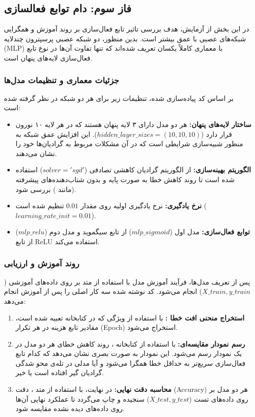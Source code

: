 \documentclass{article}
\begin{document}
\subsection{فاز سوم: دام توابع فعالسازی }
در این بخش از آزمایش، هدف بررسی تاثیر تابع فعال‌سازی بر روند آموزش و همگرایی شبکه‌های عصبی با عمق بیشتر است. بدین منظور، دو شبکه عصبی پرسپترون چندلایه (MLP) با معماری کاملاً یکسان تعریف شده‌اند که تنها تفاوت آن‌ها در نوع تابع فعال‌سازی لایه‌های پنهان است. 

\subsubsection{جزئیات معماری و تنظیمات مدل‌ها}
بر اساس کد پیاده‌سازی شده، تنظیمات زیر برای هر دو شبکه در نظر گرفته شده است:
\begin{itemize}
	\item \textbf{ساختار لایه‌های پنهان:} هر دو مدل دارای ۳ لایه پنهان هستند که در هر لایه ۱۰ نورون قرار دارد ($hidden\_layer\_sizes=(10, 10, 10)$). این افزایش عمق شبکه به منظور شبیه‌سازی شرایطی است که در آن مشکلات مربوط به گرادیان‌ها خود را نشان می‌دهند.
	\item \textbf{الگوریتم بهینه‌سازی:} از الگوریتم گرادیان کاهشی تصادفی ($solver='sgd'$) استفاده شده است تا روند کاهش خطا به صورت پایه و بدون شتاب‌دهنده‌های پیشرفته (مانند ) بررسی شود.
	\item \textbf{نرخ یادگیری:} نرخ یادگیری اولیه روی مقدار $0.01$ تنظیم شده است ($learning\_rate\_init=0.01$).
	\item \textbf{توابع فعال‌سازی:} مدل اول ($mlp\_sigmoid$) از تابع سیگموید  و مدل دوم ($mlp\_relu$) از تابع ReLU استفاده می‌کند.
\end{itemize}

\subsubsection{روند آموزش و ارزیابی }
پس از تعریف مدل‌ها، فرآیند آموزش مدل با استفاده از متد  بر روی داده‌های آموزشی ($X\_train, y\_train$) انجام می‌شود. 
کد نوشته شده سه کار اصلی را پس از آموزش انجام می‌دهد:
\begin{enumerate}
	\item \textbf{استخراج منحنی افت خطا :} با استفاده از ویژگی  که در کتابخانه  تعبیه شده است، مقادیر تابع هزینه در هر تکرار (Epoch) استخراج می‌شود.
	\item \textbf{رسم نمودار مقایسه‌ای:} با استفاده از کتابخانه ، روند کاهش خطای هر دو مدل در یک نمودار رسم می‌شود. این نمودار به صورت بصری نشان می‌دهد که کدام تابع فعال‌سازی سریع‌تر به حداقل خطا همگرا می‌شود و آیا مدلی در تله‌ی محو شدگی گرادیان  گیر افتاده است یا خیر.
	\item \textbf{محاسبه دقت نهایی:} در نهایت، با استفاده از متد ، دقت (Accuracy) هر دو مدل بر روی داده‌های تست ($X\_test, y\_test$) سنجیده و چاپ می‌گردد تا عملکرد نهایی آن‌ها روی داده‌های دیده نشده مقایسه شود.
\end{enumerate}
\end{document}
